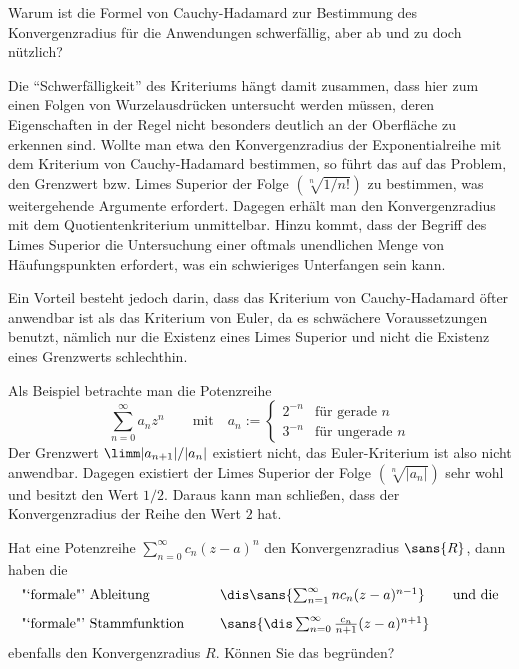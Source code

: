 \begin{frage}\label{02_chkok}
  Warum ist die Formel von Cauchy-Hadamard zur Bestimmung des Konvergenzradius 
  für die Anwendungen schwerfällig, aber ab und zu doch nützlich?
\end{frage}

\begin{antwort}
  Die "`Schwerfälligkeit"' des Kriteriums hängt damit zusammen,
  dass hier zum einen Folgen von Wurzelausdrücken untersucht werden müssen, 
  deren Eigenschaften in der Regel nicht besonders deutlich an der Oberfläche 
  zu erkennen sind. Wollte man etwa den Konvergenzradius der 
  Exponentialreihe mit dem Kriterium von Cauchy-Hadamard bestimmen, 
  so führt das auf das Problem, den Grenzwert bzw. 
  Limes Superior der Folge $(\sqrt[n]{1/n!})$ zu bestimmen, was weitergehende 
  Argumente erfordert. Dagegen erhält man den Konvergenzradius mit dem 
  Quotientenkriterium unmittelbar. 
  Hinzu kommt, dass der Begriff des Limes Superior die Untersuchung 
  einer oftmals unendlichen Menge von Häufungspunkten erfordert, was ein 
  schwieriges Unterfangen sein kann. 

  Ein Vorteil besteht jedoch darin, dass das Kriterium von Cauchy-Hadamard 
  öfter anwendbar ist als das Kriterium von Euler, 
  da es schwächere Voraussetzungen benutzt, nämlich nur 
  die Existenz eines Limes Superior und nicht die Existenz eines Grenzwerts 
  schlechthin. 

  Als Beispiel betrachte man die Potenzreihe 
  \[
  \sum_{n=0}^\infty  a_n z^n \qquad\text{mit}\quad 
  a_n := \left\{ \begin{array}{ll} 
      2^{-n} & \text{für gerade $n$} \\
      3^{-n} & \text{für ungerade $n$}
    \end{array}\right.
  \]
  Der Grenzwert $\limm |a_{n+1}|/|a_n|$ existiert nicht, 
  das Euler-Kriterium ist also nicht anwendbar. Dagegen existiert der Limes 
  Superior der Folge $(\sqrt[n]{|a_n|})$ sehr wohl und besitzt den Wert $1/2$. 
  Daraus kann man schließen, dass der Konvergenzradius der Reihe den 
  Wert $2$ hat. \AntEnd 
\end{antwort}

\begin{frage}\label{02_kok1}
  Hat eine Potenzreihe $\sum_{n=0}^\infty c_n (z-a)^n$ 
  den Konvergenzradius $\sans{R}$, dann haben die 
  \[
  \begin{array}{lp{2mm}l}
    \text{"`formale"' Ableitung}  & &
    \dis \sans{\sum_{n=1}^\infty  n c_n  (z-a)^{n-1}} 
    \qquad\text{und die} \\[3mm]
    \text{"`formale"' Stammfunktion} & &  
    \sans{\dis \sum_{n=0}^\infty \frac{c_n}{n+1}  (z-a)^{n+1}} 
  \end{array}
  \]
  ebenfalls den 
  Konvergenzradius $R$. Können Sie das begründen?
\end{frage}

